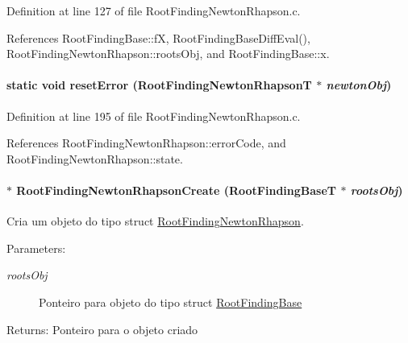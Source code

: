 Definition at line 127 of file RootFindingNewtonRhapson.c.

References RootFindingBase::fX, RootFindingBaseDiffEval(), RootFindingNewtonRhapson::rootsObj, and RootFindingBase::x.\hypertarget{group____newton_g3ebdf784fb05eaa2cc11fee2f1eef503}{
\paragraph[resetError]{\setlength{\rightskip}{0pt plus 5cm}static void resetError ({\bf RootFindingNewtonRhapsonT} $\ast$ {\em newtonObj})}\hfill}
\label{group____newton_g3ebdf784fb05eaa2cc11fee2f1eef503}




Definition at line 195 of file RootFindingNewtonRhapson.c.

References RootFindingNewtonRhapson::errorCode, and RootFindingNewtonRhapson::state.\hypertarget{group____newton_ga2ec468a98e05720903ac94228426bed}{
\paragraph[RootFindingNewtonRhapsonCreate]{$\ast$ RootFindingNewtonRhapsonCreate ({\bf RootFindingBaseT} $\ast$ {\em rootsObj})}\hfill}
\label{group____newton_ga2ec468a98e05720903ac94228426bed}


Cria um objeto do tipo struct \hyperlink{structRootFindingNewtonRhapson}{RootFindingNewtonRhapson}. 

\begin{Desc}
\item[Parameters:]
\begin{description}
\item[{\em rootsObj}]Ponteiro para objeto do tipo struct \hyperlink{structRootFindingBase}{RootFindingBase} \end{description}
\end{Desc}
\begin{Desc}
\item[Returns:]Ponteiro para o objeto criado \end{Desc}


